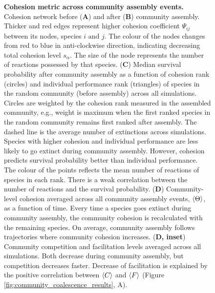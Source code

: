 \documentclass[titlepage,11pt]{article}
\begin{document}
\begin{linenumbers}
\begin{figure}
			\caption{\textbf{Cohesion metric across community assembly events.} Cohesion network before (\textbf{A}) and after (\textbf{B}) community assembly. Thicker and red edges represent higher  cohesion coefficient $ \Psi_{ij} $ between its nodes, species $ i \text{ and } j $. The colour of the nodes changes from red to blue in anti-clockwise direction, indicating decreasing total cohesion level $ s_{\alpha} $. The size of the node represents the number of reactions possessed by that species. (\textbf{C}) Median survival probability after community assembly as a function of cohesion rank (circles) and individual performance rank (triangles) of species in the random community (before assembly) across all simulations. Circles are weighted by the cohesion rank measured in the assembled community, e.g., weight is maximum when the first ranked species in the random community remains first ranked after assembly. The dashed line is the average number of extinctions across simulations. Species with higher cohesion and individual performance are less likely to go extinct during community assembly. However, cohesion predicts survival probability better than individual performance. The colour of the points reflects the mean number of reactions of species in each rank. There is a weak correlation between the number of reactions and the survival probability. (\textbf{D})  Community-level cohesion averaged across all community assembly events,  $\braket{\Theta} $, as a function of time. Every time a species goes extinct during community assembly, the community cohesion is recalculated with the remaining species. On average, community assembly follows trajectories where community cohesion increases. (\textbf{D, inset}) Community competition and facilitation levels averaged across all simulations. Both decrease during community assembly, but competition decreases faster. Decrease of facilitation is explained by the positive correlation between $ \braket{C} $ and $ \braket{F} $ (Figure \ref{fig:community_coalescence_results}, A).}
			\label{fig:interaction_evolution}
		\end{figure}

\end{linenumbers}
\end{document}
